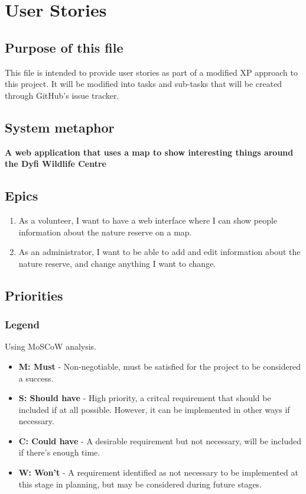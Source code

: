\chapter{User Stories}

\section{Purpose of this file}

This file is intended to provide user stories as part of a modified XP approach to this project. It will be modified into tasks and sub-tasks that will be created through GitHub's issue tracker.

\section{System metaphor}

\textbf{A web application that uses a map to show interesting things around the Dyfi Wildlife Centre}

\section{Epics}

\begin{enumerate}
	\item As a volunteer, I want to have a web interface where I can show people information about the nature reserve on a map.
	\item As an administrator, I want to be able to add and edit information about the nature reserve, and change anything I want to change.
\end{enumerate}

\section{Priorities}

\subsection{Legend}

Using MoSCoW analysis.

\begin{itemize}
	\item \textbf{M: Must} - Non-negotiable, must be satisfied for the project to be considered a success.
	\item \textbf{S: Should have} - High priority, a critcal requirement that should be included if at all possible. However, it can be implemented in other ways if necessary.
	\item \textbf{C: Could have} - A desirable requirement but not necessary, will be included if there's enough time.
	\item \textbf{W: Won't} - A requirement identified as not necessary to be implemented at this stage in planning, but may be considered during future stages.
\end{itemize}

